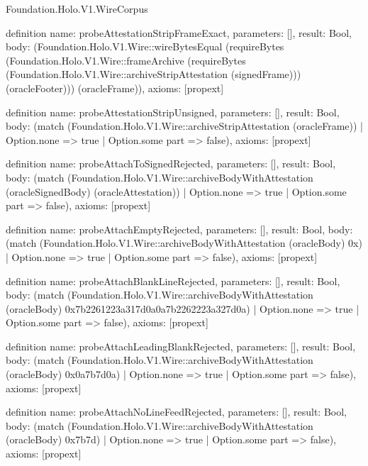 \begin{lexlean}{Foundation.Holo.V1.WireCorpus}
\begin{semanticmodule}
definition{
  name: probeAttestationStripFrameExact,
  parameters: [],
  result: Bool,
  body: (Foundation.Holo.V1.Wire::wireBytesEqual (requireBytes (Foundation.Holo.V1.Wire::frameArchive (requireBytes (Foundation.Holo.V1.Wire::archiveStripAttestation (signedFrame))) (oracleFooter))) (oracleFrame)),
  axioms: [propext]
}

definition{
  name: probeAttestationStripUnsigned,
  parameters: [],
  result: Bool,
  body: (match (Foundation.Holo.V1.Wire::archiveStripAttestation (oracleFrame))
    | Option.none => true
    | Option.some part => false),
  axioms: [propext]
}

definition{
  name: probeAttachToSignedRejected,
  parameters: [],
  result: Bool,
  body: (match (Foundation.Holo.V1.Wire::archiveBodyWithAttestation (oracleSignedBody) (oracleAttestation))
    | Option.none => true
    | Option.some part => false),
  axioms: [propext]
}

definition{
  name: probeAttachEmptyRejected,
  parameters: [],
  result: Bool,
  body: (match (Foundation.Holo.V1.Wire::archiveBodyWithAttestation (oracleBody) 0x)
    | Option.none => true
    | Option.some part => false),
  axioms: [propext]
}

definition{
  name: probeAttachBlankLineRejected,
  parameters: [],
  result: Bool,
  body: (match (Foundation.Holo.V1.Wire::archiveBodyWithAttestation (oracleBody) 0x7b2261223a317d0a0a7b2262223a327d0a)
    | Option.none => true
    | Option.some part => false),
  axioms: [propext]
}

definition{
  name: probeAttachLeadingBlankRejected,
  parameters: [],
  result: Bool,
  body: (match (Foundation.Holo.V1.Wire::archiveBodyWithAttestation (oracleBody) 0x0a7b7d0a)
    | Option.none => true
    | Option.some part => false),
  axioms: [propext]
}

definition{
  name: probeAttachNoLineFeedRejected,
  parameters: [],
  result: Bool,
  body: (match (Foundation.Holo.V1.Wire::archiveBodyWithAttestation (oracleBody) 0x7b7d)
    | Option.none => true
    | Option.some part => false),
  axioms: [propext]
}


\end{semanticmodule}
\end{lexlean}
